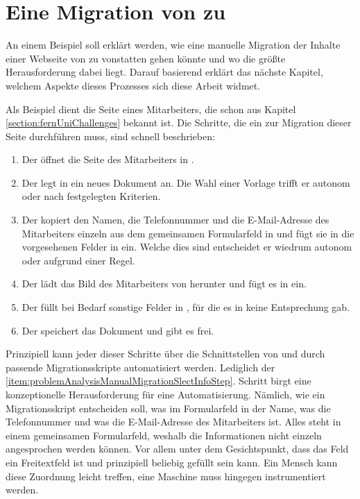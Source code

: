 \section{Eine Migration von {\wordpress} zu {\imperia}}
    An einem Beispiel soll erklärt werden,
    wie eine manuelle Migration der Inhalte einer Webseite von {\wordpress} zu {\imperia}
    vonstatten gehen könnte und wo die größte Herausforderung dabei liegt.
    Darauf basierend erklärt das nächste Kapitel,
    welchem Aspekte dieses Prozesses sich diese Arbeit widmet.

    Als Beispiel dient die Seite eines Mitarbeiters,
    die schon aus Kapitel \ref{section:fernUniChallenges} bekannt ist.
    Die Schritte, die ein {\editor} zur Migration dieser Seite durchführen muss,
    sind schnell beschrieben:

    \begin{enumerate}
        \item   Der {\editor} öffnet die Seite des Mitarbeiters in {\wordpress}.
        \item   Der {\editor} legt in {\imperia} ein neues Dokument an.
                Die Wahl einer Vorlage trifft er autonom oder nach festgelegten Kriterien.
        \item   \label{item:problemAnalysisManualMigrationSlectInfoStep}Der {\editor} kopiert den Namen, die Telefonnummer und die E-Mail-Adresse
                des Mitarbeiters einzeln aus dem gemeinsamen Formularfeld in {\wordpress}
                und fügt sie in die vorgesehenen Felder in {\imperia} ein.
                Welche dies sind entscheidet er wiedrum autonom oder aufgrund einer Regel.
        \item   Der {\editor} lädt das Bild des Mitarbeiters von {\wordpress} herunter
                und fügt es in {\imperia} ein.
        \item   Der {\editor} füllt bei Bedarf sonstige Felder in {\imperia},
                für die es in {\wordpress} keine Entsprechung gab.
        \item   Der {\editor} speichert das Dokument und gibt es frei.
    \end{enumerate}

    Prinzipiell kann jeder dieser Schritte über die Schnittstellen von {\wordpress}
    und {\imperia} durch passende Migrationsskripte automatisiert werden.
    Lediglich der \ref{item:problemAnalysisManualMigrationSlectInfoStep}. Schritt
    birgt eine konzeptionelle Herausforderung für eine Automatisierung.
    Nämlich, wie ein Migrationsskript entscheiden soll, was im Formularfeld in {\wordpress}
    der Name, was die Telefonnummer und was die E-Mail-Adresse des Mitarbeiters ist.
    Alles steht in einem gemeinsamen Formularfeld, weshalb die Informationen nicht
    einzeln angesprochen werden können.
    Vor allem unter dem Gesichtspunkt, dass das Feld ein Freitextfeld ist und prinzipiell beliebig gefüllt sein kann.
    Ein Mensch kann diese Zuordnung leicht treffen,
    eine Maschine muss hingegen instrumentiert werden.
